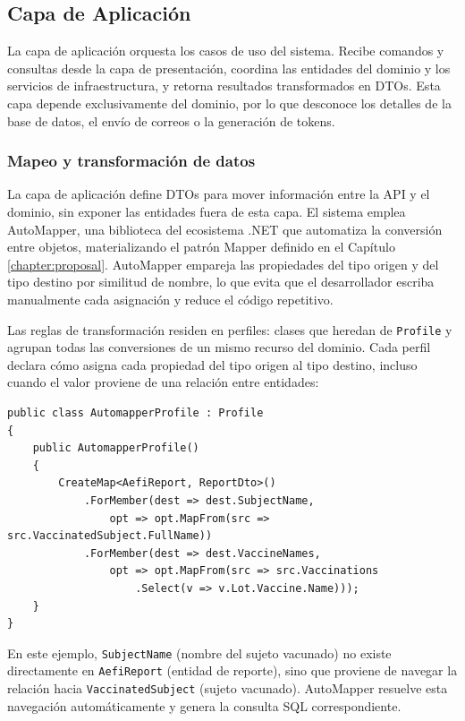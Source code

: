 \subsection{Capa de Aplicación}
\label{subsection:aplicacion}

La capa de aplicación orquesta los casos de uso del sistema. Recibe comandos y consultas desde la capa de presentación, coordina las entidades del dominio y los servicios de infraestructura, y retorna resultados transformados en DTOs. Esta capa depende exclusivamente del dominio, por lo que desconoce los detalles de la base de datos, el envío de correos o la generación de tokens.



\subsubsection{Mapeo y transformación de datos}

La capa de aplicación define DTOs para mover información entre la API y el dominio, sin exponer las entidades fuera de esta capa. 
El sistema emplea AutoMapper, una biblioteca del ecosistema .NET que automatiza la conversión entre objetos, materializando el patrón Mapper definido en el Capítulo \ref{chapter:proposal}. 
AutoMapper empareja las propiedades del tipo origen y del tipo destino por similitud de nombre, lo que evita que el desarrollador escriba manualmente cada asignación y reduce el código repetitivo.

Las reglas de transformación residen en perfiles: clases que heredan de \texttt{Profile} y agrupan todas las conversiones de un mismo recurso del dominio. 
Cada perfil declara cómo asigna cada propiedad del tipo origen al tipo destino, incluso cuando el valor proviene de una relación entre entidades:

\begin{lstlisting}[language={[Sharp]C}, caption={Perfil de mapeo con AutoMapper}, label={lst:mapper_profile}]
public class AutomapperProfile : Profile
{
    public AutomapperProfile()
    {
        CreateMap<AefiReport, ReportDto>()
            .ForMember(dest => dest.SubjectName,
                opt => opt.MapFrom(src => src.VaccinatedSubject.FullName))
            .ForMember(dest => dest.VaccineNames,
                opt => opt.MapFrom(src => src.Vaccinations
                    .Select(v => v.Lot.Vaccine.Name)));
    }
}
\end{lstlisting}

En este ejemplo, \texttt{SubjectName} (nombre del sujeto vacunado) no existe directamente en \texttt{AefiReport} (entidad de reporte), sino que proviene de navegar la relación hacia \texttt{VaccinatedSubject} (sujeto vacunado).
AutoMapper resuelve esta navegación automáticamente y genera la consulta SQL correspondiente.


